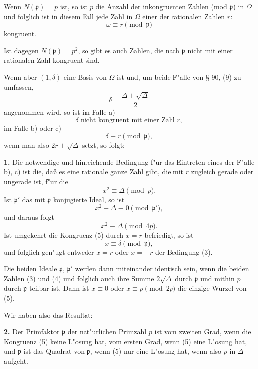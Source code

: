 \documentclass[12pt,a4paper]{article}
\theoremstyle{plain}
\begin{document}
Wenn $N(\mathfrak{p}) = p$ ist, so ist $p$ die Anzahl der inkongruenten Zahlen (mod $\mathfrak{p}$) in $\Omega$ und folglich ist in diesem Fall jede Zahl in $\Omega$ einer der rationalen Zahlen $r$:
\begin{equation}
\omega \equiv r \pmod{\mathfrak{p}}
\tag{1}
\end{equation}
kongruent.

Ist dagegen $N(\mathfrak{p}) = p^2$, so gibt es auch Zahlen, die nach $\mathfrak{p}$ nicht mit einer rationalen Zahl kongruent sind.

Wenn aber $(1, \delta)$ eine Basis von $\Omega$ ist und, um beide F"alle von \S{} 90, (9) zu umfassen,
\begin{equation}
\delta = \frac{\Delta + \sqrt{\Delta}}{2}
\tag{2}
\end{equation}
angenommen wird, so ist im Falle a)
\[
\delta \text{ nicht kongruent mit einer Zahl } r,
\]
im Falle b) oder c)
\[
\delta \equiv r \pmod{\mathfrak{p}},
\]
wenn man also $2r + \sqrt{\Delta}$ setzt, so folgt:

\textbf{1.} Die notwendige und hinreichende Bedingung f"ur das Eintreten eines der F"alle b), c) ist die, da\ss{} es eine rationale ganze Zahl gibt, die mit $r$ zugleich gerade oder ungerade ist, f"ur die
\begin{equation}
x^2 \equiv \Delta \pmod{p}.
\tag{3}
\end{equation}
Ist $\mathfrak{p}'$ das mit $\mathfrak{p}$ konjugierte Ideal, so ist
\begin{equation}
x^2 - \Delta \equiv 0 \pmod{\mathfrak{p}'},
\tag{4}
\end{equation}
und daraus folgt
\begin{equation}
x^2 \equiv \Delta \pmod{4p}.
\tag{5}
\end{equation}
Ist umgekehrt die Kongruenz (5) durch $x = r$ befriedigt, so ist
\[
x \equiv \delta \pmod{\mathfrak{p}},
\]
und folglich gen"ugt entweder $x = r$ oder $x = -r$ der Bedingung (3).

Die beiden Ideale $\mathfrak{p}$, $\mathfrak{p}'$ werden dann miteinander identisch sein, wenn die beiden Zahlen (3) und (4) und folglich auch ihre Summe $2\sqrt{\Delta}$ durch $\mathfrak{p}$ und mithin $p$ durch $\mathfrak{p}$ teilbar ist. Dann ist $x \equiv 0$ oder $x \equiv p \pmod{2p}$ die einzige Wurzel von (5).

Wir haben also das Resultat:

\textbf{2.} Der Primfaktor $\mathfrak{p}$ der nat"urlichen Primzahl $p$ ist vom zweiten Grad, wenn die Kongruenz (5) keine L"osung hat, vom ersten Grad, wenn (5) eine L"osung hat, und $\mathfrak{p}$ ist das Quadrat von $\mathfrak{p}$, wenn (5) nur eine L"osung hat, wenn also $p$ in $\Delta$ aufgeht.
\end{document}

